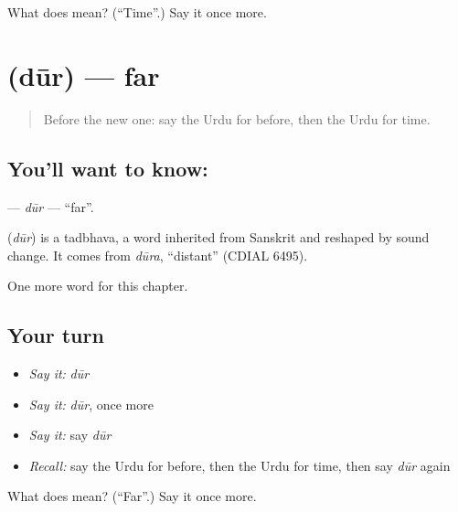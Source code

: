 \begin{tcolorbox}[breakable,colback=teal!4,colframe=teal!35!black,title={Before you move on}]
What does  mean? (\textquotedblleft{}Time\textquotedblright{}.) Say it once more.
\end{tcolorbox}
\section[\texorpdfstring{\ur{دور} (dūr)}{دور (dūr)}]{ (dūr) — far}

\label{lesson:UR-C78-dur}



\begin{quote}
Before the new one: say the Urdu for before, then the Urdu for time.
\end{quote}

\subsection*{You'll want to know: }
\textbf{} — \emph{dūr} — \textquotedblleft{}far\textquotedblright{}.

\begin{cousinweb}
\textbf{} (\emph{dūr}) is a tadbhava, a word inherited from Sanskrit and reshaped by sound change. It comes from \emph{dūra}, \textquotedblleft{}distant\textquotedblright{} (CDIAL 6495).
\end{cousinweb}

\begin{grammarlens}[title={What you've built}]
One more word for this chapter.
\end{grammarlens}

\subsection*{Your turn}
\begin{itemize}
\raggedright
  \item \emph{Say it:} \emph{dūr}
  \item \emph{Say it:} \emph{dūr}, once more
  \item \emph{Say it:} say \emph{dūr}
  \item \emph{Recall:} say the Urdu for before, then the Urdu for time, then say \emph{dūr} again
\end{itemize}

\begin{tcolorbox}[breakable,colback=teal!4,colframe=teal!35!black,title={Before you move on}]
What does  mean? (\textquotedblleft{}Far\textquotedblright{}.) Say it once more.
\end{tcolorbox}
